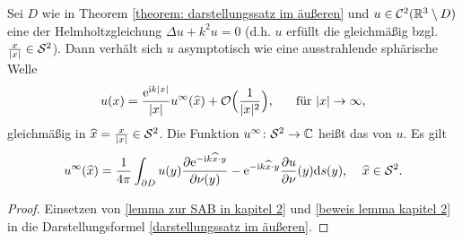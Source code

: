 \begin{sa+de}\label{satz+def: fernfeld}
	Sei \(D\) wie in Theorem \ref{theorem: darstellungssatz im äußeren} und \(u\in\mathcal{C}^2(\mathbb{R}^3\setminus D)\) eine  der Helmholtzgleichung \(\Delta u+k^2u=0\) (d.h. \(u\) erfüllt die \SAB gleichmäßig bzgl. \(\frac{x}{|x|}\in\mathcal{S}^2\)). Dann verhält sich \(u\) asymptotisch wie eine ausstrahlende sphärische Welle
	\begin{equation}
		\label{definition und satz in kapitel 2 gleichung}
		u(x)=\frac{\mathrm{e}^{\mathrm{i} k|x|}}{|x|}u^\infty(\widehat{x})+\mathcal{O}\Big(\frac{1}{|x|^2}\Big),\;\;\;\;\;\text{ für }|x|\rightarrow\infty,
	\end{equation}
	gleichmäßig in \(\widehat{x}=\frac{x}{|x|}\in\mathcal{S}^2\). Die Funktion \(u^\infty\colon\mathcal{S}^2 \to \mathbb{C}\) heißt das  von \(u\). Es gilt
	\begin{equation}
		\label{fernfeld definition kapitel 2}
		u^\infty(\widehat{x})=\frac{1}{4\pi}\int_{\partial D}u(y)\frac{\partial\mathrm{e}^{-\mathrm{i} k\widehat{x}\cdot y}}{\partial\nu(y)}-\mathrm{e}^{-\mathrm{i} k\widehat{x}\cdot y}\frac{\partial u}{\partial\nu}(y)\mathrm{d}s(y),\;\;\;\;\widehat{x}\in\mathcal{S}^2.
	\end{equation}
\end{sa+de}
\begin{proof}
	Einsetzen von \eqref{lemma zur SAB in kapitel 2} und \eqref{beweis lemma kapitel 2} in die Darstellungsformel \eqref{darstellungssatz im äußeren}.
\end{proof}














